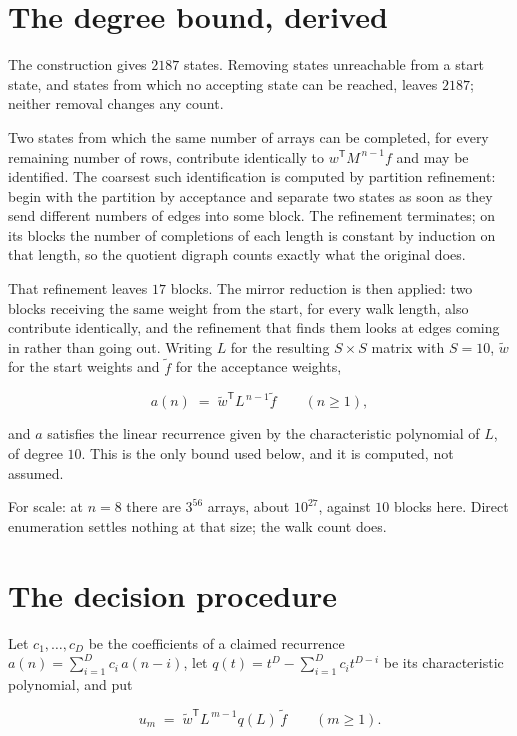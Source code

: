 \documentclass[11pt]{article}
\theoremstyle{definition}
\begin{document}
\section{The degree bound, derived}

The construction gives $2187$ states. Removing states unreachable from a start state, and states from which no accepting state can be reached, leaves $2187$; neither removal changes any count.

Two states from which the same number of arrays can be completed, for every remaining number of rows, contribute identically to $w^{\mathsf T}M^{\,n-1}f$ and may be identified. The coarsest such identification is computed by partition refinement: begin with the partition by acceptance and separate two states as soon as they send different numbers of edges into some block. The refinement terminates; on its blocks the number of completions of each length is constant by induction on that length, so the quotient digraph counts exactly what the original does.

That refinement leaves $17$ blocks. The mirror reduction is then applied: two blocks receiving the same weight from the start, for every walk length, also contribute identically, and the refinement that finds them looks at edges coming in rather than going out. Writing $L$ for the resulting $S \times S$ matrix with $S = 10$, $\tilde w$ for the start weights and $\tilde f$ for the acceptance weights,

\[a(n) \;=\; \tilde w^{\mathsf T} L^{\,n-1} \tilde f \qquad (n \ge 1),\]

and $a$ satisfies the linear recurrence given by the characteristic polynomial of $L$, of degree $10$. This is the only bound used below, and it is computed, not assumed.

For scale: at $n = 8$ there are $3^{56}$ arrays, about $10^{27}$, against $10$ blocks here. Direct enumeration settles nothing at that size; the walk count does.

\section{The decision procedure}

Let $c_1,\dots,c_D$ be the coefficients of a claimed recurrence $a(n) = \sum_{i=1}^{D} c_i\,a(n-i)$, let $q(t) = t^{D} - \sum_{i=1}^{D} c_i t^{D-i}$ be its characteristic polynomial, and put

\[u_m \;=\; \tilde w^{\mathsf T} L^{\,m-1} q(L)\,\tilde f \qquad (m \ge 1).\]
\end{document}
